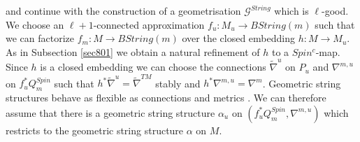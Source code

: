 \documentclass[12pt]{article}
\newcommand{\id}{{\tt id}}
\newcommand{\cG}{{\mathcal{G}}}
\renewcommand{\ker}{{\tt ker}}
\begin{document}
% 
% 
%
%
%
% 
and  continue with the construction of a geometrisation $\cG^{String}$ which is $\ell$-good. We choose an $\ell+1$-connected approximation $f_{u}:M_{u}\to BString(m)$ such that we can factorize
$f_{m}:M\to BString(m)$  over the closed embedding $h:M\to M_{u}$.  
As in Subsection \ref{sec801} we obtain
a natural refinement of $h$ to a $Spin^{c}$-map. Since $h$ is a closed embedding we can choose the
connections $\tilde \nabla^{u}$ on $P_{u}$ and $\nabla^{m,u}$ on $f_{u}^{*}Q^{Spin}_{m}$ such that
$h^{*}\tilde \nabla^{u}=\tilde \nabla^{TM}$ stably and $h^{*}\nabla^{m,u}=\nabla^{m}$.
Geometric string structures behave as flexible as connections and metrics \cite{2009arXiv0906.0117W}.
We can therefore assume that there is a geometric string structure $\alpha_{u}$ on $(f_{u}^{*}Q^{Spin}_{m},\nabla^{m,u})$ which restricts to the geometric string structure $\alpha$ on $M$.
\end{document}
